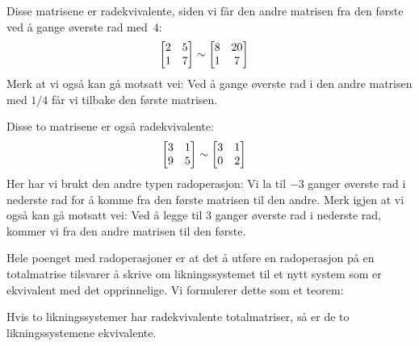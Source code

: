 \begin{ex}
Disse matrisene er radekvivalente, siden vi får den andre matrisen fra
den første ved å gange øverste rad med~$4$:
\begin{align*}
\begin{bmatrix}
 2 & 5 \\
 1 & 7
\end{bmatrix}
&\sim
\begin{bmatrix}
 8 & 20 \\
 1 &  7
\end{bmatrix}
\end{align*}
Merk at vi også kan gå motsatt vei: Ved å gange øverste rad i den
andre matrisen med $1/4$ får vi tilbake den første matrisen.

Disse to matrisene er også radekvivalente:
\begin{align*}
\begin{bmatrix}
 3 & 1 \\
 9 & 5
\end{bmatrix}
&\sim
\begin{bmatrix}
 3 & 1 \\
 0 & 2
\end{bmatrix}
\end{align*}
Her har vi brukt den andre typen radoperasjon: Vi la til $-3$ ganger
øverste rad i nederste rad for å komme fra den første matrisen til den
andre.  Merk igjen at vi også kan gå motsatt vei: Ved å legge til $3$
ganger øverste rad i nederste rad, kommer vi fra den andre matrisen
til den første.
\end{ex}

Hele poenget med radoperasjoner er at det å utføre en radoperasjon på
en totalmatrise tilsvarer å skrive om likningssystemet til et nytt
system som er ekvivalent med det opprinnelige.  Vi formulerer dette
som et teorem:

\begin{thm}
Hvis to likningssystemer har radekvivalente totalmatriser, så er de to
likningssystemene ekvivalente.
\end{thm}

